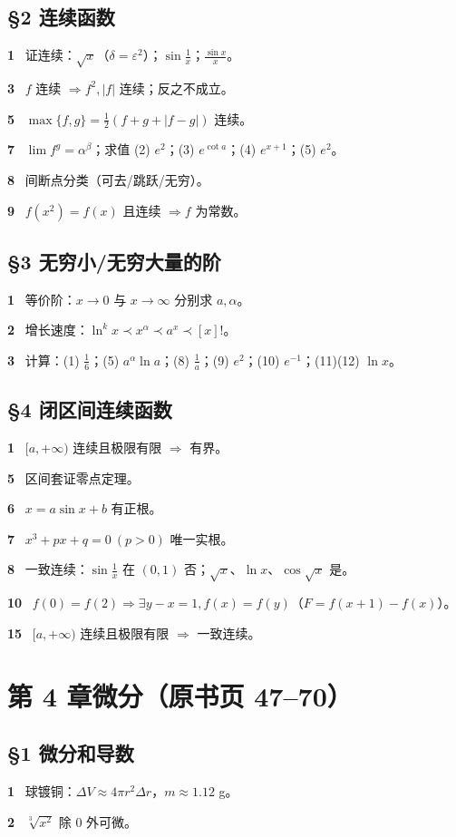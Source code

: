 \documentclass[11pt,a4paper,UTF8]{ctexart}
\newcommand{\eps}{\varepsilon}
\newcommand{\qitem}[1]{\par\smallskip\noindent\textbf{#1}\ }
\begin{document}
\subsection*{§2 连续函数}
\qitem{1} 证连续：$\sqrt x$（$\delta=\eps^2$）；$\sin\frac1x$；$\frac{\sin x}x$。\\
\qitem{3} $f$ 连续 $\Rightarrow f^2,|f|$ 连续；反之不成立。\\
\qitem{5} $\max\{f,g\}=\frac12(f+g+|f-g|)$ 连续。\\
\qitem{7} $\lim f^g=\alpha^\beta$；求值 (2) $e^2$；(3) $e^{\cot a}$；(4) $e^{x+1}$；(5) $e^2$。\\
\qitem{8} 间断点分类（可去/跳跃/无穷）。\\
\qitem{9} $f(x^2)=f(x)$ 且连续 $\Rightarrow f$ 为常数。

\subsection*{§3 无穷小/无穷大量的阶}
\qitem{1} 等价阶：$x\to0$ 与 $x\to\infty$ 分别求 $a,\alpha$。\\
\qitem{2} 增长速度：$\ln^k x\prec x^\alpha\prec a^x\prec[x]!$。\\
\qitem{3} 计算：(1) $\frac16$；(5) $a^\alpha\ln a$；(8) $\frac1a$；(9) $e^2$；(10) $e^{-1}$；(11)(12) $\ln x$。

\subsection*{§4 闭区间连续函数}
\qitem{1} $[a,+\infty)$ 连续且极限有限 $\Rightarrow$ 有界。\\
\qitem{5} 区间套证零点定理。\\
\qitem{6} $x=a\sin x+b$ 有正根。\\
\qitem{7} $x^3+px+q=0\ (p>0)$ 唯一实根。\\
\qitem{8} 一致连续：$\sin\frac1x$ 在 $(0,1)$ 否；$\sqrt x$、$\ln x$、$\cos\sqrt x$ 是。\\
\qitem{10} $f(0)=f(2)\Rightarrow\exists y-x=1,f(x)=f(y)$（$F=f(x+1)-f(x)$）。\\
\qitem{15} $[a,+\infty)$ 连续且极限有限 $\Rightarrow$ 一致连续。

\section{第 4 章\quad 微分（原书页 47--70）}
\subsection*{§1 微分和导数}
\qitem{1} 球镀铜：$\Delta V\approx4\pi r^2\Delta r$，$m\approx1.12$ g。\\
\qitem{2} $\sqrt[3]{x^2}$ 除 $0$ 外可微。
\end{document}
